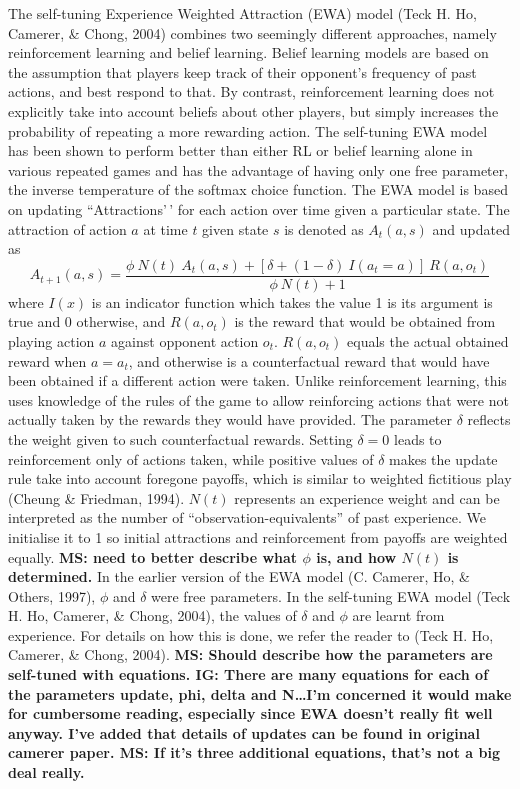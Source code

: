 \documentclass[
  english,
  man,floatsintext]{apa6}
\begin{document}
The self-tuning Experience Weighted Attraction (EWA) model (Teck H. Ho, Camerer, \& Chong, 2004) combines two seemingly different approaches, namely reinforcement learning and belief learning. Belief learning models are based on the assumption that players keep track of their opponent's frequency of past actions, and best respond to that. By contrast, reinforcement learning does not explicitly take into account beliefs about other players, but simply increases the probability of repeating a more rewarding action. The self-tuning EWA model has been shown to perform better than either RL or belief learning alone in various repeated games and has the advantage of having only one free parameter, the inverse temperature of the softmax choice function. The EWA model is based on updating ``Attractions'\,' for each action over time given a particular state. The attraction of action \(a\) at time \(t\) given state \(s\) is denoted as \(A_{t}(a, s)\) and updated as
\[ A_{t+1}(a,s) =  \frac{\phi \ N(t) \ A_{t}(a,s) + [ \delta + (1-\delta) \ I(a_t = a )] \ R(a,o_t) } {\phi \ N(t) + 1} \]
where \(I(x)\) is an indicator function which takes the value 1 is its argument is true and 0 otherwise, and \(R(a,o_t)\) is the reward that would be obtained from playing action \(a\) against opponent action \(o_t\). \(R(a,o_t)\) equals the actual obtained reward when \(a = a_t\), and otherwise is a counterfactual reward that would have been obtained if a different action were taken. Unlike reinforcement learning, this uses knowledge of the rules of the game to allow reinforcing actions that were not actually taken by the rewards they would have provided. The parameter \(\delta\) reflects the weight given to such counterfactual rewards. Setting \(\delta = 0\) leads to reinforcement only of actions taken, while positive values of \(\delta\) makes the update rule take into account foregone payoffs, which is similar to weighted fictitious play (Cheung \& Friedman, 1994). \(N(t)\) represents an experience weight and can be interpreted as the number of ``observation-equivalents'' of past experience. We initialise it to 1 so initial attractions and reinforcement from payoffs are weighted equally. \textbf{MS: need to better describe what \(\phi\) is, and how \(N(t)\) is determined.} In the earlier version of the EWA model (C. Camerer, Ho, \& Others, 1997), \(\phi\) and \(\delta\) were free parameters. In the self-tuning EWA model (Teck H. Ho, Camerer, \& Chong, 2004), the values of \(\delta\) and \(\phi\) are learnt from experience. For details on how this is done, we refer the reader to (Teck H. Ho, Camerer, \& Chong, 2004). \textbf{MS: Should describe how the parameters are self-tuned with equations. IG: There are many equations for each of the parameters update, phi, delta and N\ldots I'm concerned it would make for cumbersome reading, especially since EWA doesn't really fit well anyway. I've added that details of updates can be found in original camerer paper. MS: If it's three additional equations, that's not a big deal really. }
\end{document}
